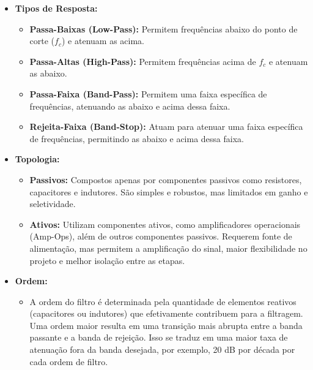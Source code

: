 \begin{itemize}
    \item \textbf{Tipos de Resposta:}
        \begin{itemize}
            \item \textbf{Passa-Baixas (Low-Pass):} Permitem frequências abaixo do ponto de corte ($f_c$) e atenuam as acima.
            \item \textbf{Passa-Altas (High-Pass):} Permitem frequências acima de $f_c$ e atenuam as abaixo.
            \item \textbf{Passa-Faixa (Band-Pass):} Permitem uma faixa específica de frequências, atenuando as abaixo e acima dessa faixa.
            \item \textbf{Rejeita-Faixa (Band-Stop):} Atuam para atenuar uma faixa específica de frequências, permitindo as abaixo e acima dessa faixa.
        \end{itemize}
    \item \textbf{Topologia:}
        \begin{itemize}
            \item \textbf{Passivos:} Compostos apenas por componentes passivos como resistores, capacitores e indutores. São simples e robustos, mas limitados em ganho e seletividade.
            \item \textbf{Ativos:} Utilizam componentes ativos, como amplificadores operacionais (Amp-Ops), além de outros componentes passivos. Requerem fonte de alimentação, mas permitem a amplificação do sinal, maior flexibilidade no projeto e melhor isolação entre as etapas.
        \end{itemize}
    \item \textbf{Ordem:}
        \begin{itemize}
            \item A ordem do filtro é determinada pela quantidade de elementos reativos (capacitores ou indutores) que efetivamente contribuem para a filtragem. Uma ordem maior resulta em uma transição mais abrupta entre a banda passante e a banda de rejeição. Isso se traduz em uma maior taxa de atenuação fora da banda desejada, por exemplo, 20 dB por década por cada ordem de filtro.
        \end{itemize}
\end{itemize}

